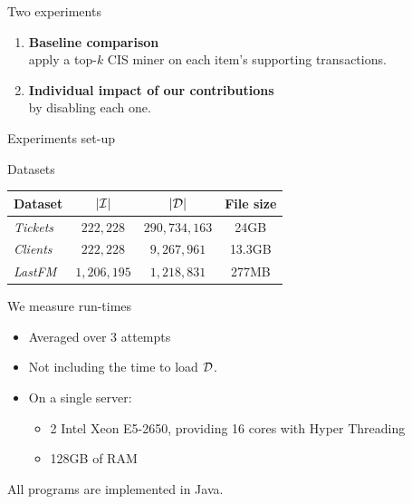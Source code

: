 \documentclass[table]{beamer}
\begin{document}
\begin{frame}{Two experiments}
  \begin{enumerate}
    \item {\bf Baseline comparison}\\
      apply a top-$k$ CIS miner on each item's supporting transactions.
    \vfill
    \item {\bf Individual impact of our contributions}\\
      by disabling each one.
  \end{enumerate}
\end{frame}


\begin{frame}{Experiments set-up}
  \begin{block}{Datasets}
    \centering
    \begin{tabular}{|l|c|c|c|}
      \hline
      {\bf Dataset}    & $|{\cal I}|$ & $|{\cal D}|$ & {\bf File size} \\\hline
      \textit{Tickets} & $222,228$ & $290,734,163$ & 24GB \\\hline
      \textit{Clients} & $222,228$ & $9,267,961$ & 13.3GB \\\hline
      \textit{LastFM}  & $1,206,195$ & $1,218,831$ & 277MB \\\hline
    \end{tabular}
  \end{block}

  \pause
  \begin{block}{We measure run-times}
    \begin{itemize}
      \item Averaged over 3 attempts
      \item Not including the time to load $\cal D$.
      \item On a single server:
        \begin{itemize}
          \item 2 Intel Xeon E5-2650, providing 16 cores with Hyper Threading
          \item 128GB of RAM
        \end{itemize}
    \end{itemize}
  \end{block}

  All programs are implemented in Java.

\end{frame}
\end{document}
